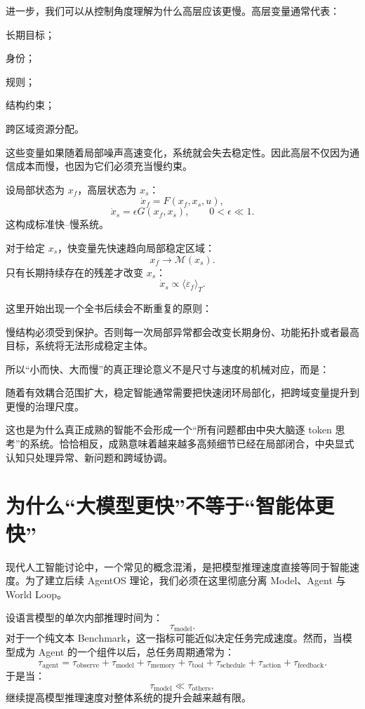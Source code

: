 进一步，我们可以从控制角度理解为什么高层应该更慢。高层变量通常代表：

长期目标；

身份；

规则；

结构约束；

跨区域资源分配。

这些变量如果随着局部噪声高速变化，系统就会失去稳定性。因此高层不仅因为通信成本而慢，也因为它们必须充当慢约束。

设局部状态为 $x_f$，高层状态为 $x_s$：
\[
\dot x_f
=
F(x_f,x_s,u),
\]
\[
\dot x_s
=
\epsilon G(x_f,x_s),
\qquad
0<\epsilon\ll1.
\]
这构成标准快--慢系统。

对于给定 $x_s$，快变量先快速趋向局部稳定区域：
\[
x_f
\rightarrow
\mathcal M(x_s).
\]
只有长期持续存在的残差才改变 $x_s$：
\[
\dot x_s
\propto
\langle
\varepsilon_f
\rangle_T.
\]

这里开始出现一个全书后续会不断重复的原则：

\begin{statementbox}
\centering
{}
\end{statementbox}

慢结构必须受到保护。否则每一次局部异常都会改变长期身份、功能拓扑或者最高目标，系统将无法形成稳定主体。

所以“小而快、大而慢”的真正理论意义不是尺寸与速度的机械对应，而是：

\begin{statementbox}
随着有效耦合范围扩大，稳定智能通常需要把快速闭环局部化，把跨域变量提升到更慢的治理尺度。
\end{statementbox}

这也是为什么真正成熟的智能不会形成一个“所有问题都由中央大脑逐 token 思考”的系统。恰恰相反，成熟意味着越来越多高频细节已经在局部闭合，中央显式认知只处理异常、新问题和跨域协调。

\section{为什么“大模型更快”不等于“智能体更快”}

现代人工智能讨论中，一个常见的概念混淆，是把模型推理速度直接等同于智能速度。为了建立后续 AgentOS 理论，我们必须在这里彻底分离 Model、Agent 与 World Loop。

设语言模型的单次内部推理时间为：
\[
\tau_{\mathrm{model}}.
\]
对于一个纯文本 Benchmark，这一指标可能近似决定任务完成速度。然而，当模型成为 Agent 的一个组件以后，总任务周期通常为：
\[
\tau_{\mathrm{agent}}
=
\tau_{\mathrm{observe}}
+
\tau_{\mathrm{model}}
+
\tau_{\mathrm{memory}}
+
\tau_{\mathrm{tool}}
+
\tau_{\mathrm{schedule}}
+
\tau_{\mathrm{action}}
+
\tau_{\mathrm{feedback}}.
\]
于是当：
\[
\tau_{\mathrm{model}}
\ll
\tau_{\mathrm{others}},
\]
继续提高模型推理速度对整体系统的提升会越来越有限。

